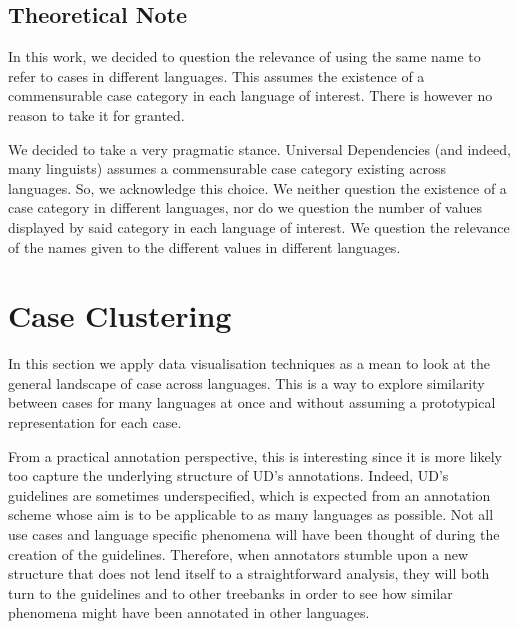 \documentclass[11pt]{article}
\begin{document}
\subsection{Theoretical Note}
In this work, we decided to question the relevance of using the same name to refer to cases in different languages.
This assumes the existence of a commensurable case category in each language of interest.
There is however no reason to take it for granted.

We decided to take a very pragmatic stance.
Universal Dependencies (and indeed, many linguists) assumes a commensurable case category existing across languages.
So, we acknowledge this choice. 
We neither question the existence of a case category in different languages, nor do we question the number of values displayed by said category in each language of interest.
We question the relevance of the names given to the different values in different languages.












\section{Case Clustering}

In this section we apply data visualisation techniques as a mean to look at the general landscape of case across languages.
This is a way to explore similarity between cases for many languages at once and without assuming a prototypical representation for each case.

From a practical annotation perspective, this is interesting since it is more likely too capture the underlying structure of UD's annotations.
Indeed, UD's guidelines are sometimes underspecified, which is expected from an annotation scheme whose aim is to be applicable to as many languages as possible.
Not all use cases and language specific phenomena will have been thought of during the creation of the guidelines.
Therefore, when annotators stumble upon a new structure that does not lend itself to a straightforward analysis, they will both turn to the guidelines and to other treebanks in order to see how similar phenomena might have been annotated in other languages.
\end{document}
